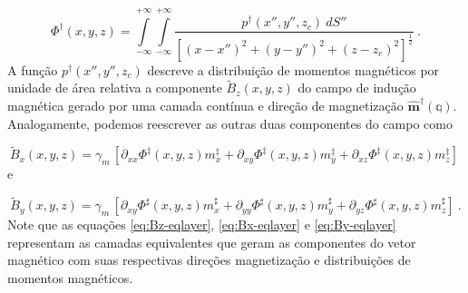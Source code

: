 \begin{equation}
\Phi^{\dagger}(x, y, z) = \int\limits_{-\infty}^{+\infty}\int\limits_{-\infty}^{+\infty}
\frac{p^{\dagger}(x'', y'', z_{c}) \: dS''}
{\left[ (x-x'')^2 + (y-y'')^2 + (z-z_{c})^2 \right]^{\frac{1}{2}}} \: .
\label{eq:Phi-integral-superficie-Bz}
\end{equation}
A função $p^{\dagger}(x'', y'', z_{c})$ descreve a distribuição de momentos magnéticos por unidade de área relativa a componente $\tilde{B}_{z}(x, y, z)$ do campo de indução magnética gerado por uma camada contínua e direção de magnetização $\hat{\mathbf{m}}^{\dagger}(\mathbb{q})$. Analogamente, podemos reescrever as outras duas componentes do campo como

\begin{equation}
\tilde{B}_{x}(x, y, z) = \gamma_{m} \, [\partial_{xx} \Phi^{\ddagger}(x, y, z) m_{x}^{\ddagger} + \partial_{xy} \Phi^{\ddagger}(x, y, z) m_{y}^{\ddagger} + \partial_{xz} \Phi^{\ddagger}(x, y, z) m_{z}^{\ddagger}]   \: 
\label{eq:Bx-eqlayer}
\end{equation}
e 

\begin{equation}
\tilde{B}_{y}(x, y, z) = \gamma_{m} \, [\partial_{xy} \Phi^{\sharp}(x, y, z) m_{x}^{\sharp} + \partial_{yy} \Phi^{\sharp}(x, y, z) m_{y}^{\sharp} + \partial_{yz} \Phi^{\sharp}(x, y, z) m_{z}^{\sharp}]   \: .
\label{eq:By-eqlayer}
\end{equation}
Note que as equações \ref{eq:Bz-eqlayer}, \ref{eq:Bx-eqlayer} e \ref{eq:By-eqlayer} representam as camadas equivalentes que geram as componentes do vetor magnético com suas respectivas direções magnetização e distribuições de momentos magnéticos. 



